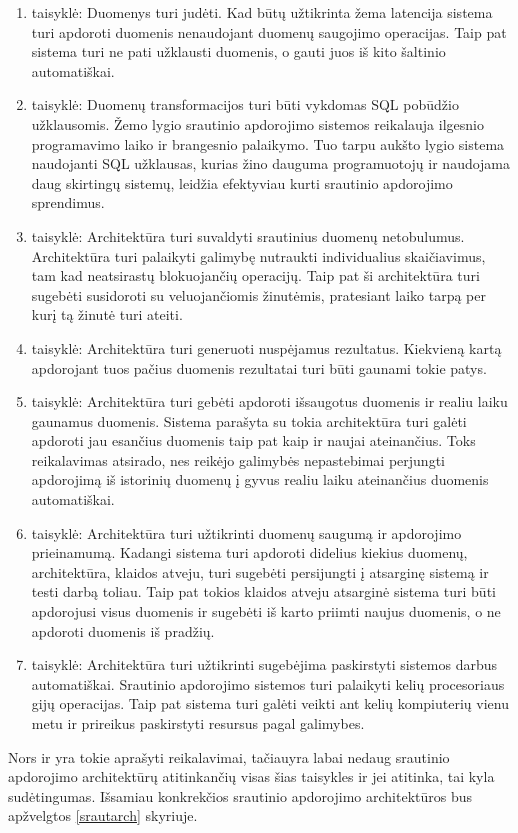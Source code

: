 \documentclass{VUMIFPSkursinis}
\begin{document}
\begin{enumerate}[label=\arabic*]
    \item taisyklė: Duomenys turi judėti. Kad būtų užtikrinta žema latencija sistema turi apdoroti duomenis nenaudojant duomenų saugojimo operacijas. Taip pat sistema turi ne pati užklausti duomenis, o gauti juos
    iš kito šaltinio automatiškai. 
    \item taisyklė: Duomenų transformacijos turi būti vykdomas SQL pobūdžio užklausomis. Žemo lygio srautinio apdorojimo sistemos reikalauja ilgesnio programavimo laiko ir brangesnio palaikymo. Tuo tarpu aukšto lygio sistema 
    naudojanti SQL užklausas, kurias žino dauguma programuotojų ir naudojama daug skirtingų sistemų, leidžia efektyviau kurti srautinio apdorojimo sprendimus.
    \item taisyklė: Architektūra turi suvaldyti srautinius duomenų netobulumus. Architektūra turi palaikyti galimybę nutraukti individualius skaičiavimus, tam kad neatsirastų blokuojančių operacijų. Taip pat ši 
    architektūra turi sugebėti susidoroti su veluojančiomis žinutėmis, pratesiant laiko tarpą per kurį tą žinutė turi ateiti.
    \item taisyklė: Architektūra turi generuoti nuspėjamus rezultatus. Kiekvieną kartą apdorojant tuos pačius duomenis rezultatai turi būti gaunami tokie patys.
    \item taisyklė: Architektūra turi gebėti apdoroti išsaugotus duomenis ir realiu laiku gaunamus duomenis. Sistema parašyta su tokia architektūra turi galėti apdoroti jau esančius duomenis taip pat kaip ir 
    naujai ateinančius. Toks reikalavimas atsirado, nes reikėjo galimybės nepastebimai perjungti apdorojimą iš istorinių duomenų į gyvus realiu laiku ateinančius duomenis automatiškai.
    \item taisyklė: Architektūra turi užtikrinti duomenų saugumą ir apdorojimo prieinamumą. Kadangi sistema turi apdoroti didelius kiekius duomenų, architektūra, klaidos atveju, turi sugebėti persijungti į atsarginę
    sistemą ir testi darbą toliau. Taip pat tokios klaidos atveju atsarginė sistema turi būti apdorojusi visus duomenis ir sugebėti iš karto priimti naujus duomenis, o ne apdoroti duomenis iš pradžių.
    \item taisyklė: Architektūra turi užtikrinti sugebėjima paskirstyti sistemos darbus automatiškai. Srautinio apdorojimo sistemos turi palaikyti kelių procesoriaus gijų operacijas. Taip pat sistema turi galėti 
    veikti ant kelių kompiuterių vienu metu ir prireikus paskirstyti resursus pagal galimybes.
\end{enumerate}
    Nors ir yra tokie aprašyti reikalavimai, tačiauyra labai nedaug srautinio apdorojimo architektūrų atitinkančių visas šias taisykles ir jei atitinka, tai kyla sudėtingumas. Išsamiau konkrekčios srautinio apdorojimo
    architektūros bus apžvelgtos \ref{srautarch} skyriuje.
\end{document}
